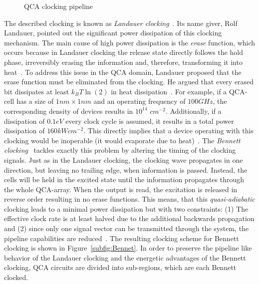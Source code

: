 
\begin{figure}
	\centering
	\caption{QCA clocking pipeline} \label{fig:QCAClockpipeline}
\end{figure}


The described clocking is known as \textit{Landauer clocking}~\cite{lent1997device}. Its name giver, Rolf Landauer, pointed out the significant power dissipation of this clocking mechanism. The main cause of high power dissipation is the \textit{erase} function, which occurs because in Landauer clocking the release state directly follows the hold phase, irreversibly erasing the information and, therefore, transforming it into heat~\cite{landauer1961irreversibility}. To address this issue in the QCA domain, Landauer proposed that the erase function must be eliminated from the clocking. He argued that every erased bit dissipates at least $k_BT\ln(2)$ in heat dissipation~\cite{keyes1970minimal}. For example, if a QCA-cell has a size of $1nm \times 1nm$ and an operating frequency of $100 GHz$, the corresponding density of devices results in $10^{14}$ $cm^{-2}$. Additionally, if a dissipation of $0.1 eV$ every clock cycle is assumed, it results in a total power dissipation of $160 kW cm^{-2}$. This directly implies that a device operating with this clocking would be inoperable (it would evaporate due to heat)~\cite{lent2006bennett}. The \textit{Bennett clocking}~\cite{lent2006bennett} tackles exactly this problem by altering the timing of the clocking signals. Just as in the Landauer clocking, the clocking wave propagates in one direction, but leaving no trailing edge, when information is passed. Instead, the cells will be held in the excited state until the information propagates through the whole QCA-array. When the output is read, the excitation is released in reverse order resulting in no erase functions. This means, that this \textit{quasi-adiabatic} clocking leads to a minimal power dissipation but with two constraints: (1) The effective clock rate is at least halved due to the additional backwards propagation and (2) since only one signal vector can be transmitted through the system, the pipeline capabilities are reduced~\cite{lent2006bennett}. The resulting clocking scheme for Bennett clocking is shown in Figure~\ref{subfig:Bennet}. In order to preserve the pipeline like behavior of the Landauer clocking and the energetic advantages of the Bennett clocking, QCA circuits are divided into sub-regions, which are each Bennett clocked.

